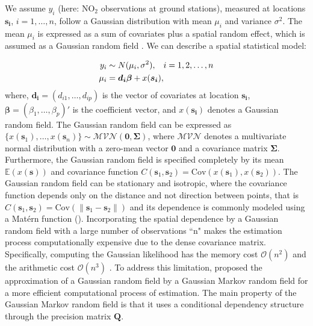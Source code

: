 \documentclass{article}
\begin{document}
We assume $y_i$ (here: NO$_2$ observations at ground stations), measured at locations $\boldsymbol{s_i}$, $i=1,\ldots,n$, follow a Gaussian distribution with mean $\mu_i$ and variance $\sigma^2$. The mean $\mu_i$ is expressed as a sum of covariates plus a spatial random effect, which is assumed as a Gaussian random field \citep{cressie2015statistics}. We can describe a spatial statistical model:

\begin{align}
y_i & \sim N(\mu_i, \sigma^2), \hspace{3mm} i = 1, 2, \ldots, n \label{eqn:eq1}\\
\mu_i & = \boldsymbol{d_i \beta} + x(\boldsymbol{s_i}), \label{eqn:eq2}
\end{align}
where, $\boldsymbol{d_i} = (d_{i1}, \ldots, d_{ip})$ is the vector of covariates at location $\boldsymbol{s_i}$, $\boldsymbol{\beta}=(\beta_1, \ldots, \beta_p)'$ is the coefficient vector, and $x(\boldsymbol{s_i})$ denotes a Gaussian random field. The Gaussian random field can be expressed as $\{x(\boldsymbol{s}_{1}),\dots, x(\boldsymbol{s}_{n})\} \sim \mathcal{MVN} (\boldsymbol{0}, \boldsymbol{\Sigma})$, where $\mathcal{MVN}$ denotes a multivariate normal distribution with a zero-mean vector $\boldsymbol{0}$ and a covariance matrix $\boldsymbol{\Sigma}$. Furthermore, the Gaussian random field is  specified completely by its mean $\mathbb{E}(x(\boldsymbol{s}))$ and covariance function $C(\boldsymbol{s}_{1}, \boldsymbol{s}_{2}) = \text{Cov}(x(\boldsymbol{s}_{1}), x(\boldsymbol{s}_{2}))$. The Gaussian random field can be stationary and isotropic, where the covariance function depends only on the distance and not direction between points, that is $C(\boldsymbol{s}_{1}, \boldsymbol{s}_{2}) = \text{Cov}(\|\boldsymbol{s}_{1} - \boldsymbol{s}_{2}\|)$ and its dependence is commonly modeled using a Matérn function (\cite{stein2012interpolation, yuan2011models, diggleetal2013}). Incorporating the spatial dependence by a Gaussian random field with a large number of observations ``n" makes the estimation process computationally expensive due to the dense covariance matrix. Specifically, computing the Gaussian likelihood has the memory cost $\mathcal{O}(n^{2})$ and the arithmetic cost $\mathcal{O}(n^{3})$ \citep{chen2021linear}. To address this limitation, \cite{rue2005gaussian} proposed the approximation of a Gaussian random field by a Gaussian Markov random field for a more efficient computational process of estimation. The main property of the Gaussian Markov random field is that it uses a conditional dependency structure through the precision matrix $\boldsymbol{Q}$. 
\end{document}
